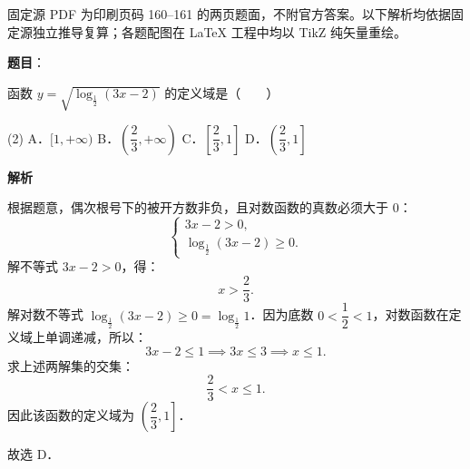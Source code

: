 

\begin{gktip}
固定源 PDF 为印刷页码 160–161 的两页题面，不附官方答案。以下解析均依据固定源独立推导复算；各题配图在 LaTeX 工程中均以 TikZ 纯矢量重绘。
\end{gktip}

\begin{answer}

\textbf{题目}：

函数 $y = \sqrt{\log_{\frac{1}{2}}(3x - 2)}$ 的定义域是\mbox{（　　）}

\begin{gkopts}(2)
\task A．$[1, +\infty)$
\task B．$\left(\dfrac{2}{3}, +\infty\right)$
\task C．$\left[\dfrac{2}{3}, 1\right]$
\task D．$\left(\dfrac{2}{3}, 1\right]$
\end{gkopts}

\textbf{解析}

根据题意，偶次根号下的被开方数非负，且对数函数的真数必须大于 $0$：
\nopagebreak[4]
\[
\begin{cases}
3x - 2 > 0, \\
\log_{\frac{1}{2}}(3x - 2) \geqslant 0.
\end{cases}
\]
解不等式 $3x - 2 > 0$，得：
\nopagebreak[4]
\[
x > \frac{2}{3}.
\]
解对数不等式 $\log_{\frac{1}{2}}(3x - 2) \geqslant 0 = \log_{\frac{1}{2}} 1$．因为底数 $0 < \dfrac{1}{2} < 1$，对数函数在定义域上单调递减，所以：
\nopagebreak[4]
\[
3x - 2 \leqslant 1 \implies 3x \leqslant 3 \implies x \leqslant 1.
\]
求上述两解集的交集：
\nopagebreak[4]
\[
\frac{2}{3} < x \leqslant 1.
\]
因此该函数的定义域为 $\left(\dfrac{2}{3}, 1\right]$．

故选 D．


\end{answer}

